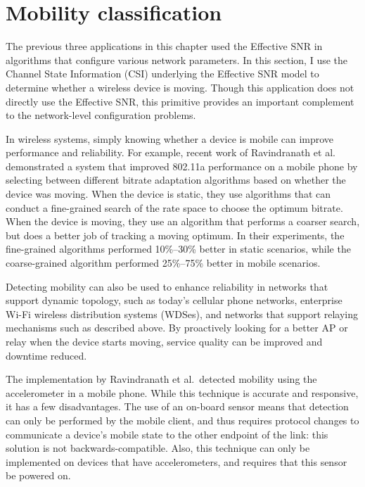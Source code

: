 \section{Mobility classification}\label{sec:esnr_mobility}
The previous three applications in this chapter used the Effective SNR in algorithms that configure various network parameters. In this section, I use the Channel State Information (CSI) underlying the Effective SNR model to determine whether a wireless device is moving. Though this application does not directly use the Effective SNR, this primitive provides an important complement to the network-level configuration problems.

In wireless systems, simply knowing whether a device is mobile can improve performance and reliability. For example, recent work of Ravindranath et al.\ \cite{Ravindranath_SensorHints} demonstrated a system that improved 802.11a performance on a mobile phone by selecting between different bitrate adaptation algorithms based on whether the device was moving. When the device is static, they use algorithms that can conduct a fine-grained search of the rate space to choose the optimum bitrate. When the device is moving, they use an algorithm that performs a coarser search, but does a better job of tracking a moving optimum. In their experiments, the fine-grained algorithms performed 10\%--30\% better in static scenarios, while the coarse-grained algorithm performed 25\%--75\% better in mobile scenarios.

Detecting mobility can also be used to enhance reliability in networks that support dynamic topology, such as today's cellular phone networks, enterprise Wi-Fi wireless distribution systems (WDSes), and networks that support relaying mechanisms such as described above. By proactively looking for a better AP or relay when the device starts moving, service quality can be improved and downtime reduced. 

The implementation by Ravindranath et al.\ detected mobility using the accelerometer in a mobile phone. While this technique is accurate and responsive, it has a few disadvantages. The use of an on-board sensor means that detection can only be performed by the mobile client, and thus requires protocol changes to communicate a device's mobile state to the other endpoint of the link: this solution is not backwards-compatible. Also, this technique can only be implemented on devices that have accelerometers, and requires that this sensor be powered on.

